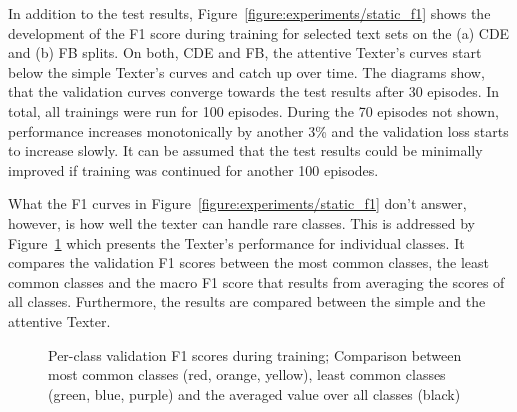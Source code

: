 In addition to the test results, Figure~\ref{figure:experiments/static_f1} shows the development of the F1 score during training for selected text sets on the (a) CDE and (b) FB splits. On both, CDE and FB, the attentive Texter's curves start below the simple Texter's curves and catch up over time. The diagrams show, that the validation curves converge towards the test results after 30 episodes. In total, all trainings were run for 100 episodes. During the 70 episodes not shown, performance increases monotonically by another 3\% and the validation loss starts to increase slowly. It can be assumed that the test results could be minimally improved if training was continued for another 100 episodes.

%
%

What the F1 curves in Figure~\ref{figure:experiments/static_f1} don't answer, however, is how well the texter can handle rare classes. This is addressed by Figure~\ref{fig:5_experiments/4_texter/2_static/static_classes} which presents the Texter's performance for individual classes. It compares the validation F1 scores between the most common classes, the least common classes and the macro F1 score that results from averaging the scores of all classes. Furthermore, the results are compared between the simple and the attentive Texter.

\begin{figure}[t]
    \centering
    
    \caption{Per-class validation F1 scores during training; Comparison between most common classes (red, orange, yellow), least common classes (green, blue, purple) and the averaged value over all classes (black)}
    \label{fig:5_experiments/4_texter/2_static/static_classes}
\end{figure}

